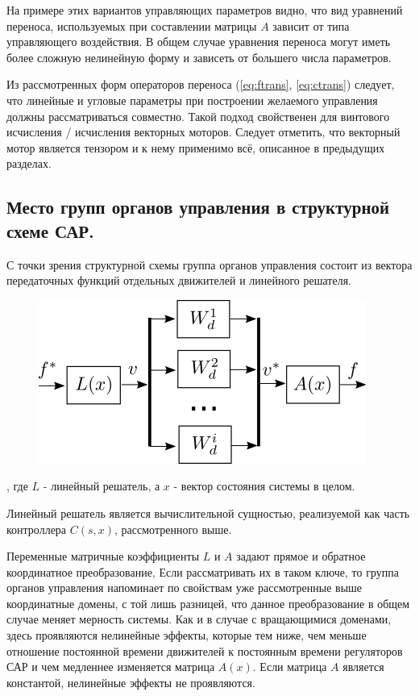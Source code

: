 \documentclass[a4paper]{article}
\begin{document}
На примере этих вариантов управляющих параметров видно, что вид уравнений переноса, используемых при составлении матрицы $A$ зависит от типа управляющего воздействия. В общем случае уравнения переноса могут иметь более сложную нелинейную форму и зависеть от большего числа параметров. 

Из рассмотренных форм операторов переноса (\ref{eq:ftrans}, \ref{eq:ctrans}) следует, что линейные и угловые параметры при построении желаемого управления должны рассматриваться совместно. Такой подход свойственен для винтового исчисления / исчисления векторных моторов. Следует отметить, что векторный мотор является тензором и к нему применимо всё, описанное в предыдущих разделах.  

\subsection{Место групп органов управления в структурной схеме САР.}
С точки зрения структурной схемы группа органов управления состоит из вектора передаточных функций отдельных движителей и линейного решателя.

{
\begin{figure}[H]
\centering
\includegraphics{./src/slau.png}
\end{figure}
}

, где $L$ - линейный решатель, а $x$ - вектор состояния системы в целом. 

Линейный решатель является вычислительной сущностью, реализуемой как часть контроллера $C(s,x)$, рассмотренного выше.

Переменные матричные коэффициенты $L$ и $A$ задают прямое и обратное координатное преобразование, Если рассматривать их в таком ключе, то группа органов управления напоминает по свойствам уже рассмотренные выше координатные домены, с той лишь разницей, что данное преобразование в общем случае меняет мерность системы. Как и в случае с вращающимися доменами, здесь проявляются нелинейные эффекты, которые тем ниже, чем меньше отношение постоянной времени движителей к постоянным времени регуляторов САР и чем медленнее изменяется матрица $A(x)$. Если матрица $A$ является константой, нелинейные эффекты не проявляются. 
\end{document}
